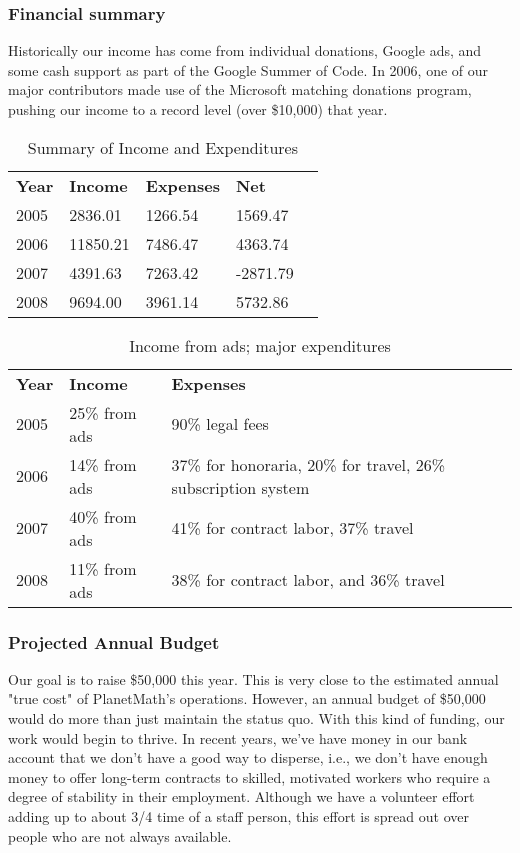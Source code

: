 
\subsubsection*{Financial summary}
Historically our income has come from individual donations, Google ads, and
some cash support as part of the Google Summer of Code. In 2006, one of our
major contributors made use of the Microsoft matching donations program,
pushing our income to a record level (over \$10,000) that year.

\begin{table}
\begin{center}
\begin{tabular}{lllll}
{\bf Year} & {\bf Income} & {\bf Expenses} & {\bf Net} \\ 
2005 & 2836.01 & 1266.54 & 1569.47 \\ 
2006 & 11850.21 & 7486.47 &  4363.74 \\
2007 & 4391.63 &  7263.42 & -2871.79 \\ 
2008 & 9694.00 &  3961.14 &  5732.86 \\
\end{tabular}
\end{center}
\caption{Summary of Income and Expenditures}
\end{table}

\begin{table}
\begin{center}
\begin{tabular}{lll}
{\bf Year} & {\bf Income} & {\bf Expenses} \\
2005 & 25\% from ads & 90\% legal fees \\ 
2006 & 14\% from ads & 37\% for honoraria, 20\% for travel, 26\% subscription system \\
2007 & 40\% from ads &  41\% for contract labor, 37\% travel  \\ 
2008 & 11\% from ads &  38\% for contract labor, and 36\% travel \\
\end{tabular}
\end{center}
\caption{Income from ads; major expenditures}
\end{table}

\subsubsection{Projected Annual Budget}

Our goal is to raise \$50,000 this year. This is very close to the estimated
annual "true cost" of PlanetMath's operations. However, an annual budget of
\$50,000 would do more than just maintain the status quo. With this kind of
funding, our work would begin to thrive. In recent years, we've have money in
our bank account that we don't have a good way to disperse, i.e., we don't have
enough money to offer long-term contracts to skilled, motivated workers who
require a degree of stability in their employment. Although we have a volunteer
effort adding up to about 3/4 time of a staff person, this effort is spread out
over people who are not always available.


